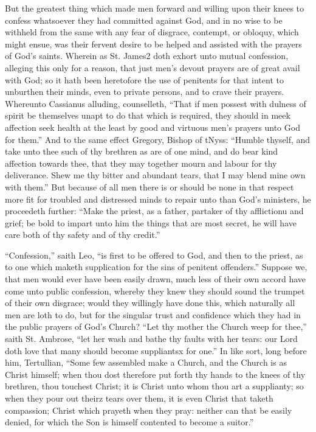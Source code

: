 But the greatest thing which made men forward and willing upon their knees to confess whatsoever they had committed against God, and in no wise to be withheld from the same with any fear of disgrace, contempt, or obloquy, which might ensue, was their fervent desire to be helped and assisted with the prayers of God’s saints. Wherein as St. James2 doth exhort unto mutual confession, alleging this only for a reason, that just men’s devout prayers are of great avail with God; so it hath been heretofore the use of penitents for that intent to unburthen their minds, even to private persons, and to crave their prayers. Whereunto Cassianus alluding, counselleth, “That if men possest with dulness of spirit be themselves unapt to do that which is required, they should in meek affection seek health at the least by good and virtuous men’s prayers unto God for them.” And to the same effect Gregory, Bishop of tNyss: “Humble thyself, and take unto thee such of thy brethren as are of one mind, and do bear kind affection towards thee, that they may together mourn and labour for thy deliverance. Shew me thy bitter and abundant tears, that I may blend mine own with them.” But because of all men there is or should be none in that respect more fit for troubled and distressed minds to repair unto than God’s ministers, he proceedeth further: “Make the priest, as a father, partaker of thy afflictionu and grief; be bold to impart unto him the things that are most secret, he will have care both of thy safety and of thy credit.”


“Confession,” saith Leo, “is first to be offered to God, and then to the priest, as to one which maketh supplication for the sins of penitent offenders.” Suppose we, that men would ever have been easily drawn, much less of their own accord have come unto public confession, whereby they knew they should sound the trumpet of their own disgrace; would they willingly have done this, which naturally all men are loth to do, but for the singular trust and confidence which they had in the public prayers of God’s Church? “Let thy mother the Church weep for thee,” saith St. Ambrose, “let her wash and bathe thy faults with her tears: our Lord doth love that many should become suppliantsx for one.” In like sort, long before him, Tertullian, “Some few assembled make a Church, and the Church is as Christ himself; when thou dost therefore put forth thy hands to the knees of thy brethren, thou touchest Christ; it is Christ unto whom thou art a supplianty; so when they pour out theirz tears over them, it is even Christ that taketh compassion; Christ which prayeth when they pray: neither can that be easily denied, for which the Son is himself contented to become a suitor.”

